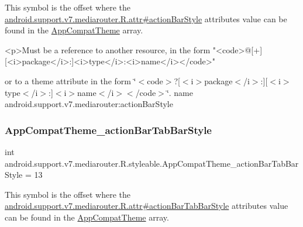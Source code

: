 This symbol is the offset where the \hyperlink{classandroid_1_1support_1_1v7_1_1mediarouter_1_1R_1_1attr_a3fa85b39fafd6ebfd535c95c2ba0a633}{android.\+support.\+v7.\+mediarouter.\+R.\+attr\#action\+Bar\+Style} attribute\textquotesingle{}s value can be found in the \hyperlink{classandroid_1_1support_1_1v7_1_1mediarouter_1_1R_1_1styleable_a4e3d3900c75d49aeb2f283cac00214d6}{App\+Compat\+Theme} array.

\begin{DoxyVerb}      <p>Must be a reference to another resource, in the form "<code>@[+][<i>package</i>:]<i>type</i>:<i>name</i></code>"
\end{DoxyVerb}
 or to a theme attribute in the form \char`\"{}$<$code$>$?\mbox{[}$<$i$>$package$<$/i$>$\+:\mbox{]}\mbox{[}$<$i$>$type$<$/i$>$\+:\mbox{]}$<$i$>$name$<$/i$>$$<$/code$>$\char`\"{}.  name android.\+support.\+v7.\+mediarouter\+:action\+Bar\+Style \mbox{\label{classandroid_1_1support_1_1v7_1_1mediarouter_1_1R_1_1styleable_af1dbff66a310e66d54936e5a64a53920}} 
\subsubsection{\texorpdfstring{App\+Compat\+Theme\+\_\+action\+Bar\+Tab\+Bar\+Style}{AppCompatTheme\_actionBarTabBarStyle}}
{\footnotesize\ttfamily int android.\+support.\+v7.\+mediarouter.\+R.\+styleable.\+App\+Compat\+Theme\+\_\+action\+Bar\+Tab\+Bar\+Style = 13\hspace{0.3cm}{\ttfamily [static]}}

This symbol is the offset where the \hyperlink{classandroid_1_1support_1_1v7_1_1mediarouter_1_1R_1_1attr_a40306e1def683ac3a79c6cee5eac1e11}{android.\+support.\+v7.\+mediarouter.\+R.\+attr\#action\+Bar\+Tab\+Bar\+Style} attribute\textquotesingle{}s value can be found in the \hyperlink{classandroid_1_1support_1_1v7_1_1mediarouter_1_1R_1_1styleable_a4e3d3900c75d49aeb2f283cac00214d6}{App\+Compat\+Theme} array.

